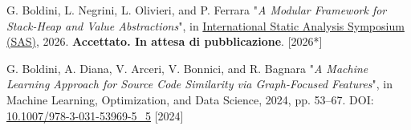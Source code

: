 


\begin{cvhonors}

\cvhonor
    {G. Boldini, L. Negrini, L. Olivieri, and P. Ferrara}
    {"\textit{A Modular Framework for Stack-Heap and Value Abstractions}",
     in \href{https://conf.researchr.org/home/splash-issta-2026/sas-2026}{International Static Analysis Symposium (SAS)}, 2026. \textbf{Accettato. In attesa di pubblicazione}.}
    {}
    {[2026*]}

\cvhonor
    {G. Boldini, A. Diana, V. Arceri, V. Bonnici, and R. Bagnara}
    {"\textit{A Machine Learning Approach for Source Code Similarity via Graph-Focused Features}",
     in Machine Learning, Optimization, and Data Science, 2024, pp. 53–67.
     DOI: \href{https://doi.org/10.1007/978-3-031-53969-5_5}{10.1007/978-3-031-53969-5\_5}}
    {}
    {[2024]}

\end{cvhonors}
